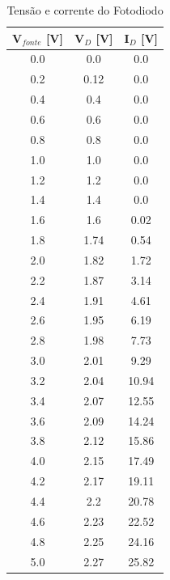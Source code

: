 \begin{table}[!h]
    \centering
    \caption{Tensão e corrente do Fotodiodo}
    \label{tab:circ1}
    \vspace{0.25cm}
    \begin{tabular}{ccc}
        \hline
        \rule{0pt}{3ex}\textbf{\textbf{V}}$_{fonte}$ [V] & \textbf{\textbf{V}}$_{D}$ [V] & \textbf{\textbf{I}}$_{D}$ [V] \\[5pt]
        \hline
        \rule{0pt}{3ex}0.0 & 0.0 & 0.0 \\
        0.2 & 0.12 & 0.0 \\
        0.4 & 0.4 & 0.0 \\
        0.6 & 0.6 & 0.0 \\
        0.8 & 0.8 & 0.0 \\
        1.0 & 1.0 & 0.0 \\
        1.2 & 1.2 & 0.0 \\
        1.4 & 1.4 & 0.0 \\
        1.6 & 1.6 & 0.02 \\
        1.8 & 1.74 & 0.54 \\
        2.0 & 1.82 & 1.72 \\
        2.2 & 1.87 & 3.14 \\
        2.4 & 1.91 & 4.61 \\
        2.6 & 1.95 & 6.19 \\
        2.8 & 1.98 & 7.73 \\
        3.0 & 2.01 & 9.29 \\
        3.2 & 2.04 & 10.94 \\
        3.4 & 2.07 & 12.55 \\
        3.6 & 2.09 & 14.24 \\
        3.8 & 2.12 & 15.86 \\
        4.0 & 2.15 & 17.49 \\
        4.2 & 2.17 & 19.11 \\
        4.4 & 2.2 & 20.78 \\
        4.6 & 2.23 & 22.52 \\
        4.8 & 2.25 & 24.16 \\
        5.0 & 2.27 & 25.82 \\ [5pt]
        \hline
    \end{tabular}
\end{table}